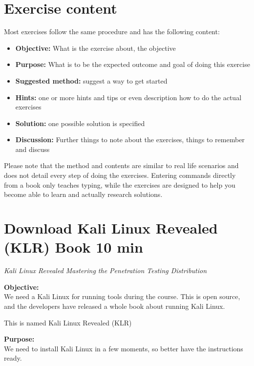 \documentclass[a4paper,11pt,notitlepage]{report}
\begin{document}

\chapter*{\color{titlecolor}Exercise content}

Most exercises follow the same procedure and has the following content:
\begin{itemize}
\item {\bf Objective:} What is the exercise about, the objective
\item {\bf Purpose:} What is to be the expected outcome and goal of doing this exercise
\item {\bf Suggested method:} suggest a way to get started
\item {\bf Hints:} one or more hints and tips or even description how to
do the actual exercises
\item {\bf Solution:} one possible solution is specified
\item {\bf Discussion:} Further things to note about the exercises, things to remember and discuss
\end{itemize}

Please note that the method and contents are similar to real life scenarios and does not detail every step of doing the exercises. Entering commands directly from a book only teaches typing, while the exercises are designed to help you become able to learn and actually research solutions.


\chapter{Download Kali Linux Revealed (KLR) Book 10 min}
\label{ex:downloadKLR}



\emph{Kali Linux Revealed  Mastering the Penetration Testing Distribution}


{\bf Objective:}\\
We need a Kali Linux for running tools during the course. This is open source, and the developers have released a whole book about running Kali Linux.

This is named Kali Linux Revealed (KLR)

{\bf Purpose:}\\
We need to install Kali Linux in a few moments, so better have the instructions ready.
\end{document}
